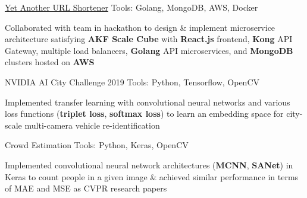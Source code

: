 \begin{cventries}
  \cventryprojects
    {\href{https://github.com/nguyensjsu/fa19-281-team-red-1}{Yet Another URL Shortener}} %
    {Tools: Golang, MongoDB, AWS, Docker} %
    {
      \begin{cvitems} %
       \item {Collaborated with team in hackathon to design \& implement microservice architecture satisfying \textbf{AKF Scale Cube} with \textbf{React.js} frontend, \textbf{Kong} API Gateway, multiple load balancers, \textbf{Golang} API microservices, and \textbf{MongoDB} clusters hosted on \textbf{AWS}}
      \end{cvitems}
    }

  \cventryprojects
    {NVIDIA AI City Challenge 2019} %
    {Tools: Python, Tensorflow, OpenCV} %
    {
      \begin{cvitems} %
       \item {Implemented transfer learning with convolutional neural networks and various loss functions (\textbf{triplet loss}, \textbf{softmax loss}) to learn an embedding space for city-scale multi-camera vehicle re-identification}
      \end{cvitems}
    }

  \cventryprojects
    {Crowd Estimation} %
    {Tools: Python, Keras, OpenCV} %
    {
      \begin{cvitems} %
        \item {Implemented convolutional neural network architectures (\textbf{MCNN}, \textbf{SANet}) in Keras to count people in a given image \& achieved similar performance in terms of MAE and MSE as CVPR research papers}
      \end{cvitems}
    }


\end{cventries}
